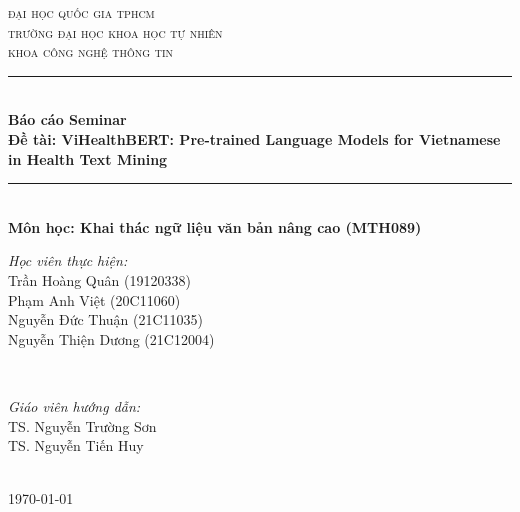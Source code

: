 \documentclass[12pt]{article}
\newcommand{\coursename}{Khai thác ngữ liệu văn bản nâng cao (MTH089)}
\newcommand{\reportname}{ViHealthBERT: Pre-trained Language Models for Vietnamese in Health Text Mining}
\begin{document}
\begin{titlepage}
\newcommand{\HRule}{\rule{\linewidth}{0.5mm}}
\centering

\textsc{\LARGE đại học quốc gia tphcm}\\[1.5cm]
\textsc{\Large trường đại học khoa học tự nhiên}\\[0.5cm]
\textsc{\large khoa công nghệ thông tin}\\[0.5cm]

\HRule \\[0.4cm]
{ 
\huge{\bfseries{Báo cáo Seminar}}\\[0.5cm]
\large{\bfseries{Đề tài: \reportname}}
}\\[0.4cm]
\HRule \\[0.5cm]

\textbf{\large Môn học: \coursename}\\[0.5cm]

\begin{minipage}[t]{0.4\textwidth}
\begin{flushleft} \large
\emph{Học viên thực hiện:}\\
Trần Hoàng Quân (19120338) \\
Phạm Anh Việt \textsc{(20C11060)} \\
Nguyễn Đức Thuận \textsc{(21C11035)} \\
Nguyễn Thiện Dương \textsc{(21C12004)} \\
\end{flushleft}
\end{minipage}
~
\begin{minipage}[t]{0.4\textwidth}
\begin{flushright} \large
\emph{Giáo viên hướng dẫn:} \\
TS. Nguyễn Trường Sơn\\
TS. Nguyễn Tiến Huy
\end{flushright}
\end{minipage}\\[1cm]

{\large \today}\\[1cm]


\end{titlepage}
\end{document}

